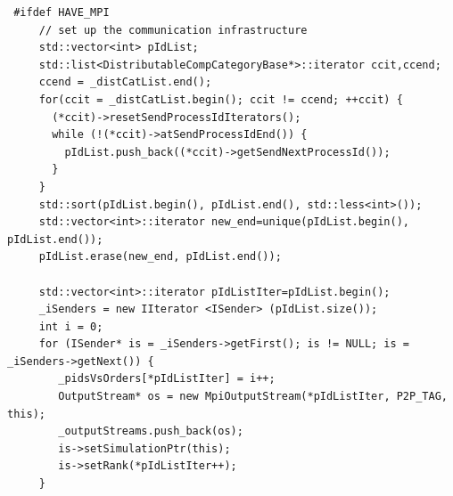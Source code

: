 \begin{verbatim}
 #ifdef HAVE_MPI                                                                                                                                                                                      
     // set up the communication infrastructure                                                                 
     std::vector<int> pIdList;                                                                                  
     std::list<DistributableCompCategoryBase*>::iterator ccit,ccend;                                            
     ccend = _distCatList.end();                                                                                
     for(ccit = _distCatList.begin(); ccit != ccend; ++ccit) {                                                  
       (*ccit)->resetSendProcessIdIterators();                                                                  
       while (!(*ccit)->atSendProcessIdEnd()) {                                                                 
         pIdList.push_back((*ccit)->getSendNextProcessId());                                                    
       }                                                                                                        
     }                                                                                                          
     std::sort(pIdList.begin(), pIdList.end(), std::less<int>());                                               
     std::vector<int>::iterator new_end=unique(pIdList.begin(), pIdList.end());                                 
     pIdList.erase(new_end, pIdList.end());                                                                     
                                                                                                                
     std::vector<int>::iterator pIdListIter=pIdList.begin();                                                    
     _iSenders = new IIterator <ISender> (pIdList.size());                                                      
     int i = 0;                                                                                                 
     for (ISender* is = _iSenders->getFirst(); is != NULL; is = _iSenders->getNext()) {                         
        _pidsVsOrders[*pIdListIter] = i++;                                                                      
        OutputStream* os = new MpiOutputStream(*pIdListIter, P2P_TAG, this);                                    
        _outputStreams.push_back(os);                                                                           
        is->setSimulationPtr(this);                                                                             
        is->setRank(*pIdListIter++);                                                                            
     }                                                                                                          
                                                                                                                

\end{verbatim}
